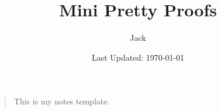 \documentclass[letterpaper, fontsize=11pt, nodate]{sizzle}
\title{Mini Pretty Proofs}
\author{Jack}
\date{Last Updated: \today}
\numberwithin{equation}{section}
\begin{document}
\maketitle
\begin{quote}
    This is my notes template.
\end{quote}
\tableofcontents

\newpage





\end{document}
